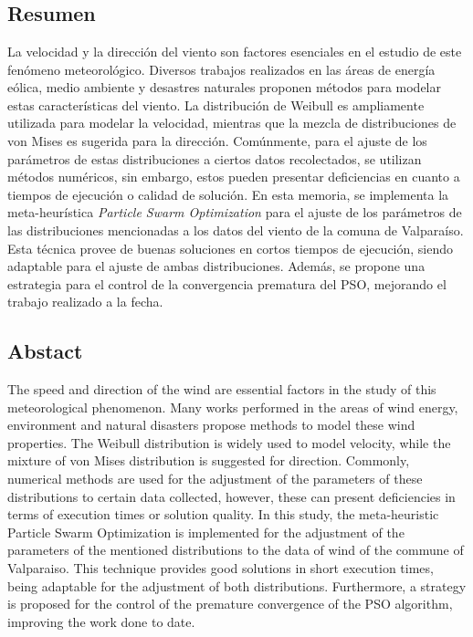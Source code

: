 \documentclass[12pt, letterpaper, oneside]{book}
\begin{document}
\frontmatter
\thispagestyle{empty}

\newpage
\chapter*{ }
\vspace{-3cm}
\newpage


\chapter*{ }
\vspace{-3cm}
\section*{Resumen}
La velocidad y la dirección del viento son factores esenciales en el estudio de este fenómeno meteorológico. Diversos trabajos realizados en las áreas de energía eólica, medio ambiente y desastres naturales proponen métodos para modelar estas características del viento. La distribución de Weibull es ampliamente utilizada para modelar la velocidad, mientras que la mezcla de distribuciones de von Mises es sugerida para la dirección. Comúnmente, para el ajuste de los parámetros de estas distribuciones a ciertos datos recolectados, se utilizan métodos numéricos, sin embargo, estos pueden presentar deficiencias en cuanto a tiempos de ejecución o calidad de solución. En esta memoria, se implementa la meta-heurística \emph{Particle Swarm Optimization} para el ajuste de los parámetros de las distribuciones mencionadas a los datos del viento de la comuna de Valparaíso. Esta técnica provee de buenas soluciones en cortos tiempos de ejecución, siendo adaptable para el ajuste de ambas distribuciones. Además, se propone una estrategia para el control de la convergencia prematura del PSO, mejorando el trabajo realizado a la fecha.
\section*{Abstact}
The speed and direction of the wind are essential factors in the study of this meteorological phenomenon. Many works performed in the areas of wind energy, environment and natural disasters propose methods to model these wind properties. The Weibull distribution is widely used to model velocity, while the mixture of von Mises distribution is suggested for direction. Commonly, numerical methods are used for the adjustment of the parameters of these distributions to certain data collected, however, these can present deficiencies in terms of execution times or solution quality. In this study, the meta-heuristic Particle Swarm Optimization is implemented for the adjustment of the parameters of the mentioned distributions to the data of wind of the commune of Valparaiso. This technique provides good solutions in short execution times, being adaptable for the adjustment of both distributions. Furthermore, a strategy is proposed for the control of the premature convergence of the PSO algorithm, improving the work done to date.
\newpage
\end{document}
